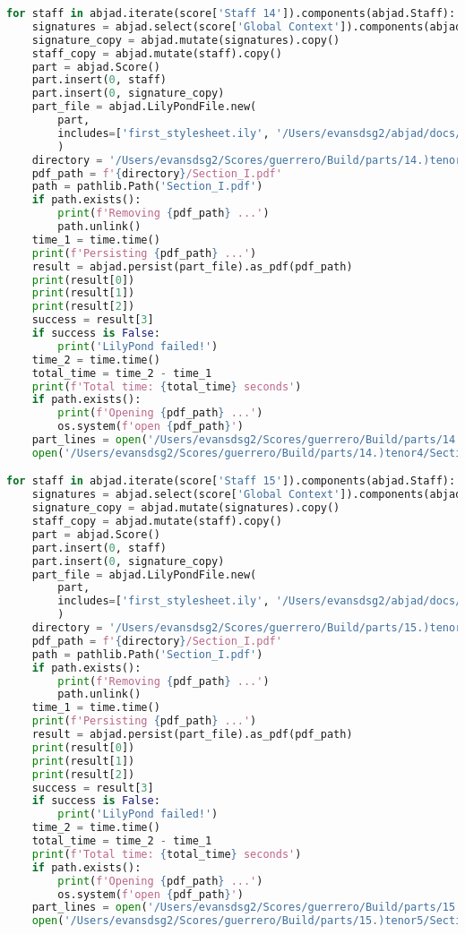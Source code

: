 \begin{lstlisting}[language=Python, caption=Invocation Source Code]
for staff in abjad.iterate(score['Staff 14']).components(abjad.Staff):
    signatures = abjad.select(score['Global Context']).components(abjad.Staff)
    signature_copy = abjad.mutate(signatures).copy()
    staff_copy = abjad.mutate(staff).copy()
    part = abjad.Score()
    part.insert(0, staff)
    part.insert(0, signature_copy)
    part_file = abjad.LilyPondFile.new(
        part,
        includes=['first_stylesheet.ily', '/Users/evansdsg2/abjad/docs/source/_stylesheets/abjad.ily'],
        )
    directory = '/Users/evansdsg2/Scores/guerrero/Build/parts/14.)tenor4'
    pdf_path = f'{directory}/Section_I.pdf'
    path = pathlib.Path('Section_I.pdf')
    if path.exists():
        print(f'Removing {pdf_path} ...')
        path.unlink()
    time_1 = time.time()
    print(f'Persisting {pdf_path} ...')
    result = abjad.persist(part_file).as_pdf(pdf_path)
    print(result[0])
    print(result[1])
    print(result[2])
    success = result[3]
    if success is False:
        print('LilyPond failed!')
    time_2 = time.time()
    total_time = time_2 - time_1
    print(f'Total time: {total_time} seconds')
    if path.exists():
        print(f'Opening {pdf_path} ...')
        os.system(f'open {pdf_path}')
    part_lines = open('/Users/evansdsg2/Scores/guerrero/Build/parts/14.)tenor4/Section_I.ly').readlines()
    open('/Users/evansdsg2/Scores/guerrero/Build/parts/14.)tenor4/Section_I.ly', 'w').writelines(part_lines[15:-1])

for staff in abjad.iterate(score['Staff 15']).components(abjad.Staff):
    signatures = abjad.select(score['Global Context']).components(abjad.Staff)
    signature_copy = abjad.mutate(signatures).copy()
    staff_copy = abjad.mutate(staff).copy()
    part = abjad.Score()
    part.insert(0, staff)
    part.insert(0, signature_copy)
    part_file = abjad.LilyPondFile.new(
        part,
        includes=['first_stylesheet.ily', '/Users/evansdsg2/abjad/docs/source/_stylesheets/abjad.ily'],
        )
    directory = '/Users/evansdsg2/Scores/guerrero/Build/parts/15.)tenor5'
    pdf_path = f'{directory}/Section_I.pdf'
    path = pathlib.Path('Section_I.pdf')
    if path.exists():
        print(f'Removing {pdf_path} ...')
        path.unlink()
    time_1 = time.time()
    print(f'Persisting {pdf_path} ...')
    result = abjad.persist(part_file).as_pdf(pdf_path)
    print(result[0])
    print(result[1])
    print(result[2])
    success = result[3]
    if success is False:
        print('LilyPond failed!')
    time_2 = time.time()
    total_time = time_2 - time_1
    print(f'Total time: {total_time} seconds')
    if path.exists():
        print(f'Opening {pdf_path} ...')
        os.system(f'open {pdf_path}')
    part_lines = open('/Users/evansdsg2/Scores/guerrero/Build/parts/15.)tenor5/Section_I.ly').readlines()
    open('/Users/evansdsg2/Scores/guerrero/Build/parts/15.)tenor5/Section_I.ly', 'w').writelines(part_lines[15:-1])


\end{lstlisting}
